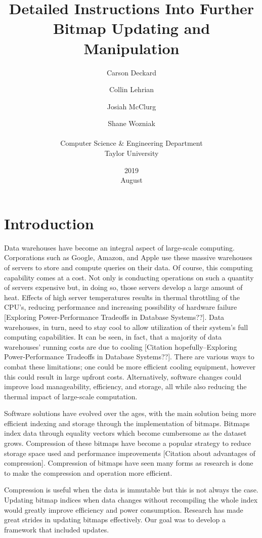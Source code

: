 \documentclass{article}
\title{Detailed Instructions Into Further Bitmap Updating and Manipulation}
\date{2019 \\ August }
\author{Carson Deckard \and Collin Lehrian \and Josiah McClurg \and Shane Wozniak \\ \\ Computer Science \&  Engineering Department \\ Taylor University}
\begin{document}
\maketitle

%
%
\section{Introduction}
\justify
Data warehouses have become an integral aspect of large-scale computing. Corporations such as Google, Amazon, and Apple use these massive warehouses of servers to store and compute queries on their data. Of course, this computing capability comes at a cost. Not only is conducting operations on such a quantity of servers expensive but, in doing so, those servers develop a large amount of heat. Effects of high server temperatures results in thermal throttling of the CPU's, reducing performance and increasing possibility of hardware failure [Exploring Power-Performance Tradeoffs in Database Systems??].
Data warehouses, in turn, need to stay cool to allow utilization of their system's full computing capabilities. It can be seen, in fact, that a majority of data warehouses' running costs are due to cooling [Citation hopefully--Exploring Power-Performance Tradeoffs in Database Systems??].
There are various ways to combat these limitations; one could be more efficient cooling equipment, however this could result in large upfront costs. Alternatively, software changes could improve load manageability, efficiency, and storage, all while also reducing the thermal impact of large-scale computation.
\par
Software solutions have evolved over the ages, with the main solution being more efficient indexing and storage through the implementation of bitmaps. Bitmaps index data through equality vectors which become cumbersome as the dataset grows.  %
Compression of these bitmaps have become a popular strategy to reduce storage space used and performance improvements [Citation about advantages of compression]. Compression of bitmaps have seen many forms as research is done to make the compression and operation more efficient. 
\par 
Compression is useful when the data is immutable but this is not always the case. Updating bitmap indices when data changes without recompiling the whole index would greatly improve efficiency and power consumption. Research has made great strides in updating bitmaps effectively. Our goal was to develop a framework that included updates. 
%
%
\end{document}
